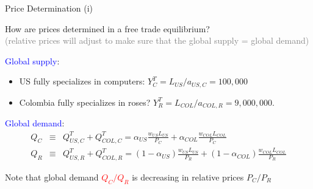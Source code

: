 \documentclass[notes,11pt, aspectratio=169, xcolor=table]{beamer}
\newcommand{\blue}[1]{\textcolor{blue}{#1}}
\newenvironment{wideitemize}{\itemize\addtolength{\itemsep}{10pt}}{\enditemize}
\begin{document}
\begin{frame}{Price Determination (i)}
\begin{wideitemize}
   

\item How are prices determined in a free trade equilibrium? \\
\qquad \textcolor{gray}{(relative prices will adjust to make sure that the global supply = global demand)}

\item \blue{Global supply}:

\begin{itemize}
    \item US fully specializes in computers: $Y^T_{C} = L_{US}/a_{US,C} = 100{,}000$
    \item Colombia fully specializes in roses? $Y^T_R = L_{COL}/a_{COL,R} = 9{,}000{,}000$. 
\end{itemize}
    
\item \blue{Global demand}:
\begin{eqnarray*}
    Q_{C} &\equiv& Q^T_{US,C} +  Q^T_{COL,C} = \alpha_{US} \frac{w_{US} L_{US} }{P_C} + \alpha_{COL} \frac{w_{COL} L_{COL} }{P_C}  \\
    Q_{R} &\equiv& Q^T_{US,R} +  Q^T_{COL,R}  = (1-\alpha_{US}) \frac{w_{US} L_{US} }{P_R} + (1-\alpha_{COL}) \frac{w_{COL} L_{COL} }{P_R}    
\end{eqnarray*}

\item Note that global demand \textcolor{red}{$Q_C/Q_R$} is decreasing in relative prices $P_C / P_R$ 
\end{wideitemize}
    
\end{frame}
\end{document}
